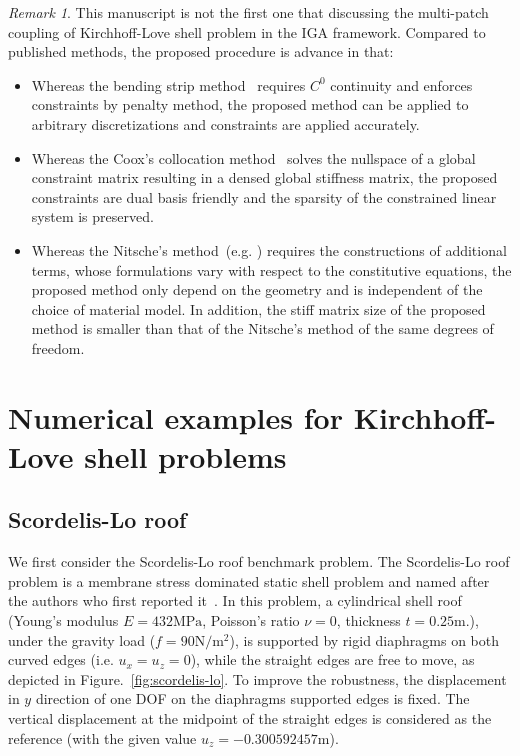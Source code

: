 \documentclass[preprint,12pt]{elsarticle}
\theoremstyle{remark}
\newtheorem{remark}{Remark}
\begin{document}
\begin{remark}
    This manuscript is not the first one that discussing the multi-patch coupling of Kirchhoff-Love shell problem in the IGA framework. Compared to published methods, the proposed procedure is advance in that:
    \begin{itemize}
        \item Whereas the bending strip method~\cite{kiendl2010bending} requires $C^0$ continuity and enforces constraints by penalty method, the proposed method can be applied to arbitrary discretizations and constraints are applied accurately.
        \item Whereas the Coox's collocation method~\cite{coox2017flexible} solves the nullspace of a global constraint matrix resulting in a densed global stiffness matrix, the proposed constraints are dual basis friendly and the sparsity of the constrained linear system is preserved.
        \item Whereas the Nitsche's method~(e.g. \cite{guo_nitsches_2015}) requires the constructions of additional terms, whose formulations vary with respect to the constitutive equations, the proposed method only depend on the geometry and is independent of the choice of material model. In addition, the stiff matrix size of the proposed method is smaller than that of the Nitsche's method of the same degrees of freedom.
    \end{itemize} 
\end{remark}

\section{Numerical examples for Kirchhoff-Love shell problems}

\subsection{Scordelis-Lo roof}

We first consider the Scordelis-Lo roof benchmark problem. The Scordelis-Lo roof problem is a membrane stress dominated static shell problem and named after the authors who first reported it~\cite{scordelis1964computer}. In this problem, a cylindrical shell roof (Young's modulus $E=432\text{MPa}$, Poisson's ratio $\nu = 0$, thickness $t = 0.25\text{m}$.), under the gravity load ($f = 90\text{N}/\text{m}^2$), is supported by rigid diaphragms on both curved edges (i.e. $u_{x}=u_z=0$), while the straight edges are free to move, as depicted in Figure.~\ref{fig:scordelis-lo}. To improve the robustness, the displacement in $y$ direction of one DOF on the diaphragms supported edges is fixed. The vertical displacement at the midpoint of the straight edges is considered as the reference (with the given value $u_z=-0.300592457\text{m}$). \par
\end{document}
